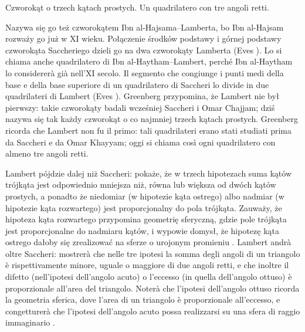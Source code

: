 \begin{definition}
[czworokąt Lamberta] %
[quadrilatero di Lambert] %
	Czworokąt o trzech kątach prostych. %
	Un quadrilatero con tre angoli retti. %
\end{definition}

Nazywa się go też czworokątem Ibn al-Hajsama--Lamberta, bo Ibn al-Hajsam rozważy go już w XI wieku. %
Połączenie środków podstawy i górnej podstawy czworokąta Saccheriego dzieli go na dwa czworokąty Lamberta (Eves \cite[s. 289, zad. 9]{eves1_1972}). %
Lo si chiama anche quadrilatero di Ibn al-Haytham--Lambert, perché Ibn al-Haytham lo considererà già nell'XI secolo. %
Il segmento che congiunge i punti medi della base e della base superiore di un quadrilatero di Saccheri lo divide in due quadrilateri di Lambert (Eves \cite[p. 289, es. 9]{eves1_1972}). %
Greenberg \cite[s. 208]{greenberg_2010} przypomina, że Lambert nie był pierwszy: takie czworokąty badali wcześniej Saccheri i Omar Chajjam; dziś nazywa się tak każdy czworokąt o co najmniej trzech kątach prostych. %
Greenberg \cite[p. 208]{greenberg_2010} ricorda che Lambert non fu il primo: tali quadrilateri erano stati studiati prima da Saccheri e da Omar Khayyam; oggi si chiama così ogni quadrilatero con almeno tre angoli retti. %

Lambert pójdzie dalej niż Saccheri: pokaże, że w trzech hipotezach suma kątów trójkąta jest odpowiednio mniejsza niż, równa lub większa od dwóch kątów prostych, a ponadto że niedomiar (w hipotezie kąta ostrego) albo nadmiar (w hipotezie kąta rozwartego) jest proporcjonalny do pola trójkąta. %
Zauważy, że hipoteza kąta rozwartego przypomina geometrię sferyczną, gdzie pole trójkąta jest proporcjonalne do nadmiaru kątów, i wypowie domysł, że hipotezę kąta ostrego dałoby się zrealizować na sferze o urojonym promieniu \cite[s. 286]{eves1_1972}. %
Lambert andrà oltre Saccheri: mostrerà che nelle tre ipotesi la somma degli angoli di un triangolo è rispettivamente minore, uguale o maggiore di due angoli retti, e che inoltre il difetto (nell'ipotesi dell'angolo acuto) o l'eccesso (in quella dell'angolo ottuso) è proporzionale all'area del triangolo. %
Noterà che l'ipotesi dell'angolo ottuso ricorda la geometria sferica, dove l'area di un triangolo è proporzionale all'eccesso, e congetturerà che l'ipotesi dell'angolo acuto possa realizzarsi su una sfera di raggio immaginario \cite[p. 286]{eves1_1972}. %

